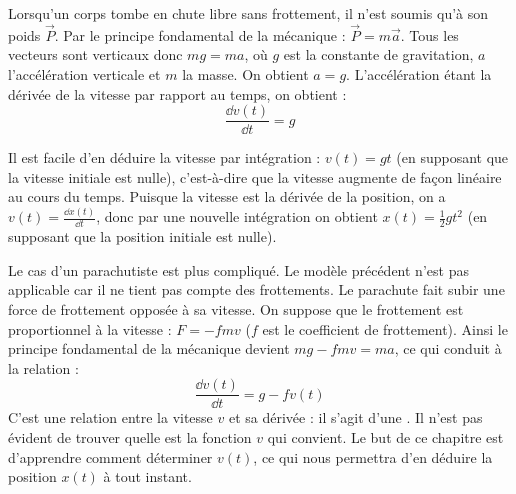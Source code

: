 \documentclass[class=report,crop=false]{standalone}
\begin{document}
\newcommand{\alenvers}[1]{\rotatebox[origin=c]{180}{#1}}







\bigskip

Lorsqu'un corps tombe en chute libre sans frottement, il n'est soumis qu'à son poids $\vec{P}$.
Par le principe fondamental de la mécanique : $\vec{P} = m\vec{a}$.
Tous les vecteurs sont verticaux donc $mg = ma$, où
$g$ est la constante de gravitation, $a$ l'accélération verticale et $m$ la masse.
On obtient $a=g$. L'accélération étant la dérivée de la vitesse par rapport au temps, on obtient :
\begin{equation}
\frac{\dd v(t)}{\dd t} = g
\label{eq:para1}
\end{equation}


Il est facile d'en déduire la vitesse par intégration :
$v(t) = gt$ (en supposant que la vitesse initiale est nulle), c'est-à-dire
que la vitesse augmente de façon linéaire au cours du temps. Puisque la vitesse est la dérivée de
la position, on a $v(t) = \frac{\dd x(t)}{\dd t}$,
donc par une nouvelle intégration on obtient $x(t) = \frac12 g t^2$
(en supposant que la position initiale est nulle).




Le cas d'un parachutiste est plus compliqué. Le modèle précédent n'est pas applicable
car il ne tient pas compte des frottements. Le parachute fait
subir une force de frottement opposée à sa vitesse. On suppose que le frottement est proportionnel
à la vitesse : $F = -fm v$ ($f$ est le coefficient de frottement).
Ainsi le principe fondamental de la mécanique devient $mg - fmv = ma$, ce qui conduit à
la relation :
\begin{equation}
\frac{\dd v(t)}{\dd t} = g - fv(t)
\label{eq:para2}
\end{equation}
C'est une relation entre la vitesse $v$ et sa dérivée : il s'agit d'une .
Il n'est pas évident de trouver quelle est la fonction $v$ qui convient.
Le but de ce chapitre est d'apprendre comment déterminer $v(t)$, ce qui nous permettra
d'en déduire la position $x(t)$ à tout instant.
\end{document}

